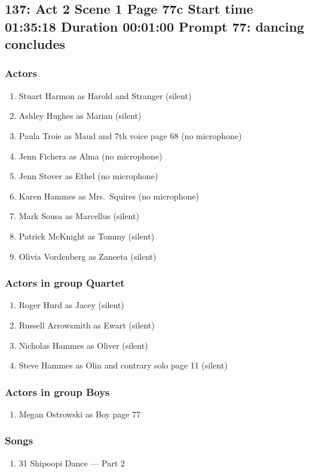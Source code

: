\subsection{137: Act 2 Scene 1 Page 77c Start time 01:35:18 Duration 00:01:00 Prompt 77: dancing concludes}

\subsubsection{Actors}
\begin{enumerate}
\item Stuart Harmon as Harold and Stranger (silent)
\item Ashley Hughes as Marian (silent)
\item Paula Troie as Maud and 7th voice page 68 (no microphone)
\item Jenn Fichera as Alma (no microphone)
\item Jenn Stover as Ethel (no microphone)
\item Karen Hammes as Mrs.~Squires (no microphone)
\item Mark Sousa as Marcellus (silent)
\item Patrick McKnight as Tommy (silent)
\item Olivia Vordenberg as Zaneeta (silent)
\end{enumerate}
\subsubsection{Actors in group Quartet}
\begin{enumerate}
\item Roger Hurd as Jacey (silent)
\item Russell Arrowsmith as Ewart (silent)
\item Nicholas Hammes as Oliver (silent)
\item Steve Hammes as Olin and contrary solo page 11 (silent)
\end{enumerate}
\subsubsection{Actors in group Boys}
\begin{enumerate}
\item Megan Ostrowski as Boy page 77
\end{enumerate}

\subsubsection{Songs}
\begin{enumerate}
\item 31 Shipoopi Dance --- Part 2
\end{enumerate}
